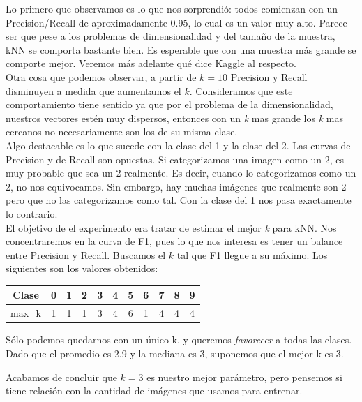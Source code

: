 Lo primero que observamos es lo que nos sorprendió: todos comienzan con un Precision/Recall de aproximadamente 0.95, lo cual es un valor muy alto. Parece ser que pese a los problemas de dimensionalidad y del tamaño de la muestra, kNN se comporta bastante bien. Es esperable que con una muestra más grande se comporte mejor. Veremos más adelante qué dice Kaggle al respecto.\\

Otra cosa que podemos observar, a partir de $k = 10$ Precision y Recall disminuyen a medida que aumentamos el $k$. Consideramos que este comportamiento tiene sentido ya que por el problema de la dimensionalidad, nuestros vectores estén muy dispersos, entonces con un \textit{k} mas grande los \textit{k} mas cercanos no necesariamente son los de su misma clase. \\

Algo destacable es lo que sucede con la clase del 1 y la clase del 2. Las curvas de Precision y de Recall son opuestas. Si categorizamos una imagen como un 2, es muy probable que sea un 2 realmente. Es decir, cuando lo categorizamos como un 2, no nos equivocamos. Sin embargo, hay muchas imágenes que realmente son 2 pero que no las categorizamos como tal. Con la clase del 1 nos pasa exactamente lo contrario. \\

El objetivo de el experimento era tratar de estimar el mejor \textit{k} para kNN. Nos concentraremos en la curva de F1, pues lo que nos interesa es tener un balance entre Precision y Recall. Buscamos el $k$ tal que F1 llegue a su máximo. Los siguientes son los valores obtenidos: \\

\begin{center}
    \begin{tabular}{| c | c | c | c | c | c | c | c | c | c | c |}
    \hline
    Clase   & 0 & 1 & 2 & 3 & 4 & 5 & 6 & 7 & 8 & 9  \\ \hline
    max_k       & 1 & 1 & 1 & 3 & 4 & 6 & 1 & 4 & 4 & 4  \\ \hline
    \end{tabular}
\end{center}

Sólo podemos quedarnos con un único k, y queremos \textit{favorecer} a todas las clases. Dado que el promedio es 2.9 y la mediana es 3, suponemos que el mejor k es 3.

Acabamos de concluir que $k=3$ es nuestro mejor parámetro, pero pensemos si tiene relación con la cantidad de imágenes que usamos para entrenar. \\

